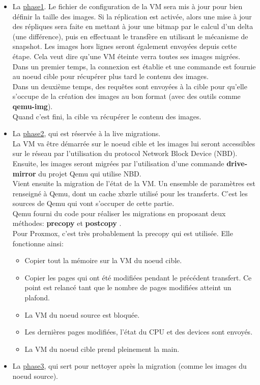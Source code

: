 \documentclass[14pt]{extarticle}
\begin{document}
    \begin{itemize}[nosep,label=\textendash]
        \item La \underline{phase1}. Le fichier de configuration de la VM sera mis à jour pour bien définir la taille des images. Si la réplication est activée, alors une mise à jour des répliques sera faite en mettant à jour une bitmap par le calcul d'un delta (une différence), puis en effectuant le transfère en utilisant le mécanisme de snapshot. Les images hors lignes seront également envoyées depuis cette étape. Cela veut dire qu'une VM éteinte verra toutes ses images migrées.\\
        Dans un premier temps, la connexion est établie et une commande est fournie au noeud cible pour récupérer plus tard le contenu des images.\\
        Dans un deuxième temps, des requêtes sont envoyées à la cible pour qu'elle s'occupe de la création des images au bon format (avec des outils comme \textbf{qemu-img}).\\
        Quand c'est fini, la cible va récupérer le contenu des images.
        \item La \underline{phase2}, qui est réservée à la live migrations.\\
        La VM va être démarrée sur le noeud cible et les images lui seront accessibles sur le réseau par l'utilisation du protocol Network Block Device (NBD).\\
        Ensuite, les images seront migrées par l'utilisation d'une commande \textbf{drive-mirror} du projet Qemu qui utilise NBD.\\
        Vient ensuite la migration de l'état de la VM. Un ensemble de paramètres est renseigné à Qemu, dont un cache xbzrle \cite{xbzrle} utilisé pour les transferts. C'est les sources de Qemu qui vont s'occuper de cette partie.\\
        Qemu fourni du code pour réaliser les migrations en proposant deux méthodes: \textbf{precopy} et \textbf{postcopy} \cite{qemu-migration,post_precopy_schem}.\\
        Pour Proxmox, c'est très probablement la precopy qui est utilisée. Elle fonctionne ainsi:
        \begin{itemize}[nosep,label=\textendash]
            \item Copier tout la mémoire sur la VM du noeud cible.
            \item Copier les pages qui ont été modifiées pendant le précédent transfert. Ce point est relancé tant que le nombre de pages modifiées atteint un plafond.
            \item La VM du noeud source est bloquée.
            \item Les dernières pages modifiées, l'état du CPU et des devices sont envoyés.
            \item La VM du noeud cible prend pleinement la main.
        \end{itemize}
        \item La \underline{phase3}, qui sert pour nettoyer après la migration (comme les images du noeud source).
    \end{itemize}
    \newpage
\end{document}
